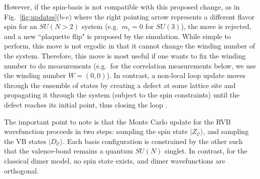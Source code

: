 \documentclass[11pt]{iopart}
\begin{document}
%
However, if the spin-basis is not compatible with this proposed change, as in Fig.~\ref{fig:updates}(b-c) where the right pointing arrow represents a different flavor spin for an $SU(N>2)$ system (e.g.\ $m_i=0$ for $SU(3)$), the move is rejected, and a new ``plaquette flip" is proposed by the simulation.
%
While simple to perform, this move is not ergodic in that it cannot change the winding number of the system.
%
Therefore, this move is most useful if one wants to fix the winding number to do measurements (e.g.\ for the correlation measurements below, we use the winding number $W=(0,0)$).
%
In contrast, a non-local loop update moves through the ensemble of states by creating a defect at some lattice site and propagating it through the system (subject to the spin constraints) until the defect reaches its initial point, thus closing the loop \cite{sandvik2010loop}.
%

The important point to note is that the Monte Carlo update for the RVB wavefunction proceeds in two steps: sampling the spin state $|Z_{\mathcal C} \rangle$, and sampling the VB states $|D_{\mathcal C} \rangle$.  Each basis configuration is constrained by the other such that the valence-bond remains a quantum $SU(N)$ singlet.  In contrast, for the classical dimer model, no spin state exists, and dimer wavefunctions are orthogonal.
\end{document}
